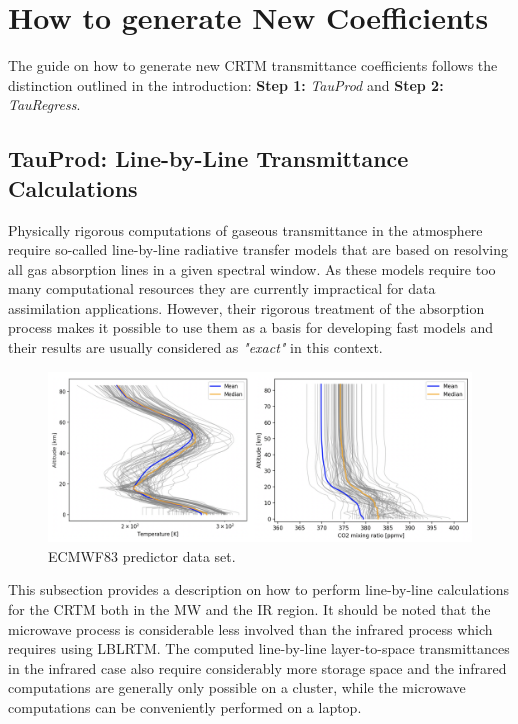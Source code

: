 \section{How to generate New Coefficients}
The guide on how to generate new CRTM transmittance coefficients follows the distinction outlined in the introduction: \textbf{Step 1:} \emph{TauProd} and \textbf{Step 2:} \emph{TauRegress}.

\subsection{TauProd: Line-by-Line Transmittance Calculations}
Physically rigorous computations of gaseous transmittance in the atmosphere require so-called line-by-line radiative transfer models that are based on resolving all gas absorption lines in a given spectral window. As these models require too many computational resources they are currently impractical for data assimilation applications.
However, their rigorous treatment of the absorption process makes it possible to use them as a basis for developing fast models and their results are usually considered as \emph{"exact"} in this context.\\
\begin{figure}[H]
 \centering
 \includegraphics[width=1.\textwidth]{graphics/ECMWF83_profiles_pic}
 \caption{ECMWF83 predictor data set.}
 \label{fig:prof}
 \end{figure}
This subsection provides a description on how to perform line-by-line calculations for the CRTM both in the MW and the IR region. It should be noted that the microwave process is considerable less involved than the infrared process which requires using LBLRTM.
The computed line-by-line layer-to-space transmittances in the infrared case also require considerably more storage space and the infrared computations are generally only possible on a cluster, while the microwave computations can be conveniently performed on a laptop.

